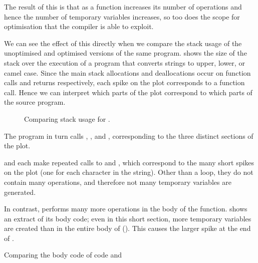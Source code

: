 \documentclass[00-main.tex]{subfiles}
\begin{document}
The result of this is that as a function increases its number of operations and hence the number of temporary variables increases, so too does the scope for optimisation that the compiler is able to exploit.

We can see the effect of this directly when we compare the stack usage of the unoptimised and optimised versions of the same program.
 shows the size of the stack over the execution of a program that converts strings to upper, lower, or camel case.
Since the main stack allocations and deallocations occur on function calls and returns respectively, each spike on the plot corresponds to a function call.
Hence we can interpret which parts of the plot correspond to which parts of the source program.

\begin{figure}[t]
  \centering
  \caption{Comparing stack usage for .}
  \label{fig:comparing stack usage for case.c} %
\end{figure}

The program in turn calls , , and , corresponding to the three distinct sections of the plot.

 and  each make repeated calls to  and , which correspond to the many short spikes on the plot (one for each character in the string).
Other than a  loop, they do not contain many operations, and therefore not many temporary variables are generated.

In contrast,  performs many more operations in the body of the function.
 shows an extract of its body code; even in this short section, more temporary variables are created than in the entire body of  ().
This causes the larger spike at the end of .

\begin{listing}[t]
  \hfill
  \caption{Comparing the body code of  code and }
  \label{lst:caseupper and casecamel body code}
\end{listing}
\end{document}
